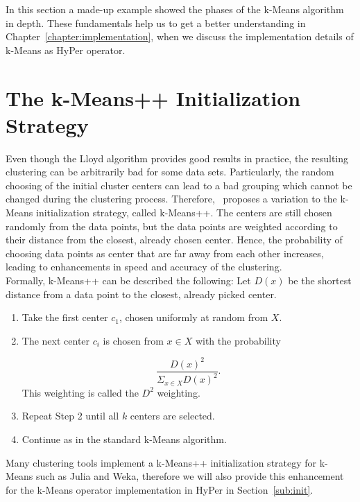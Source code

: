 In this section a made-up example showed the phases of the k-Means algorithm in depth. These fundamentals help us to get a better understanding in Chapter~\ref{chapter:implementation}, when we discuss the implementation details of k-Means as HyPer operator.



\section{The k-Means++ Initialization Strategy}\label{section:kmeans_init}

Even though the Lloyd algorithm provides good results in practice, the resulting clustering can be arbitrarily bad for some data sets. Particularly, the random choosing of the initial cluster centers can lead to a bad grouping which cannot be changed during the clustering process. Therefore,~\cite{kmeans++} proposes a variation to the k-Means initialization strategy, called k-Means++. The centers are still chosen randomly from the data points, but the data points are weighted according to their distance from the closest, already chosen center. Hence, the probability of choosing data points as center that are far away from each other increases, leading to enhancements in speed and accuracy of the clustering.
\\
Formally, k-Means++ can be described the following:
Let $D(x)$ be the shortest distance from a data point to the closest, already picked center.

\begin{enumerate} 
\item Take the first center $c_1$, chosen uniformly at random from $X$.
\item The next center $c_i$ is chosen from $x \in X$ with the probability 

\begin{equation*}
\frac {D(x)^2} {\Sigma_{x \in X} D(x)^2}.
\end{equation*}
This weighting is called the $D^2$ weighting.

\item Repeat Step 2 until all $k$ centers are selected.
\item Continue as in the standard k-Means algorithm.
\end{enumerate}

Many clustering tools implement a k-Means++ initialization strategy for k-Means such as Julia and Weka, therefore we will also provide this enhancement for the k-Means operator implementation in HyPer in Section~\ref{sub:init}.

